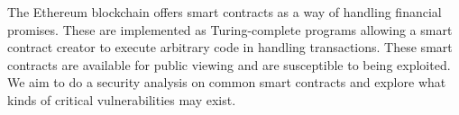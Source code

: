 The Ethereum blockchain offers smart contracts as a way of handling financial promises. These are implemented as Turing-complete programs allowing a smart contract creator to execute arbitrary code in handling transactions. These smart contracts are available for public viewing and are susceptible to being exploited. We aim to do a security analysis on common smart contracts and explore what kinds of critical vulnerabilities may exist.
